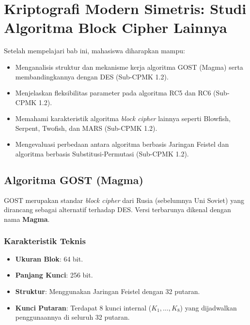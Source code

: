 \documentclass[../main.tex]{subfiles}
\begin{document}
\chapter{Kriptografi Modern Simetris: Studi Algoritma Block Cipher Lainnya}

\begin{learningoutcome}
Setelah mempelajari bab ini, mahasiswa diharapkan mampu:
\begin{itemize}
    \item Menganalisis struktur dan mekanisme kerja algoritma GOST (Magma) serta membandingkannya dengan DES (Sub-CPMK 1.2).
    \item Menjelaskan fleksibilitas parameter pada algoritma RC5 dan RC6 (Sub-CPMK 1.2).
    \item Memahami karakteristik algoritma \textit{block cipher} lainnya seperti Blowfish, Serpent, Twofish, dan MARS (Sub-CPMK 1.2).
    \item Mengevaluasi perbedaan antara algoritma berbasis Jaringan Feistel dan algoritma berbasis Substitusi-Permutasi (Sub-CPMK 1.2).
\end{itemize}
\end{learningoutcome}

\section{Algoritma GOST (Magma)}
GOST merupakan standar \textit{block cipher} dari Rusia (sebelumnya Uni Soviet) yang dirancang sebagai alternatif terhadap DES. Versi terbarunya dikenal dengan nama \textbf{Magma}.

\subsection{Karakteristik Teknis}
\begin{itemize}
    \item \textbf{Ukuran Blok}: 64 bit.
    \item \textbf{Panjang Kunci}: 256 bit.
    \item \textbf{Struktur}: Menggunakan Jaringan Feistel dengan 32 putaran.
    \item \textbf{Kunci Putaran}: Terdapat 8 kunci internal ($K_1, \dots, K_8$) yang dijadwalkan penggunaannya di seluruh 32 putaran.
\end{itemize}
\end{document}
